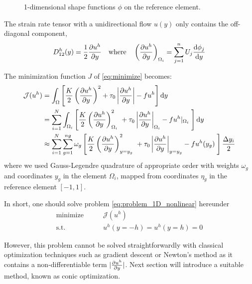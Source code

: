 \documentclass[11 pt]{report}
\begin{document}
\begin{figure}[ht]
    \centering
    
    \caption{1-dimensional shape functions $\phi$ on the reference element.}
    \label{fig:shape_fct_1D}
\end{figure}


The strain rate tensor with a unidirectional flow $u(y)$ only contains the off-diagonal component,
\begin{equation}
    D_{12}^h(y) = \frac{1}{2} \pdv{u^h}{y} \quad \text{where} \quad \left(\pdv{u^h}{y}\right)_{\Omega_i} = \sum_{j=1}^{n} U_j \dv{\phi_j}{y}
\end{equation}

The minimization function $J$ of \autoref{eq:minimize} becomes:
\begin{equation}
\begin{aligned}
    \mathcal{J}(u^h) &= \int_{\Omega} \left[ \frac{K}{2} \left(\pdv{u^h}{y}\right)^2 + \tau_0 \left|\pdv{u^h}{y}\right| - f u^h \right] \dd y\\
    &= \sum_{i=1}^N \int_{\Omega_i} \left[\frac{K}{2}  \left(\pdv{u^h}{y}\right)^2_{\Omega_i} \ + \tau_0 \left|\pdv{u^h}{y}\right|_{\Omega_i} - f u^h\vert_{\Omega_i} \; \right] \dd y\\
    &\approx \sum_{i=1}^N \sum_{g=1}^{ng} \omega_{g} \left[\frac{K}{2}  \left(\pdv{u^h}{y}\right)^2_{y=y_g} \ + \tau_0 \left|\pdv{u^h}{y}\right|_{y=y_g} - f u^h(y_g) \; \right] \frac{\Delta y_i}{2}
\end{aligned}
\end{equation}
where we used Gauss-Legendre quadrature of appropriate order with weights $\omega_g$ and coordinates $y_g$ in the element $\Omega_i$, mapped from coordinates $\eta_g$ in the reference element $[-1,1]$.

In short, one should solve problem \eqref{eq:problem_1D_nonlinear} hereunder
\begin{equation}
    \begin{aligned}
        \textrm{minimize} \qquad & \mathcal{J}(u^h)\\
        \textrm{s.t.} \qquad & u^h(y=-h) = u^h(y=h) = 0
    \end{aligned}\label{eq:problem_1D_nonlinear}
\end{equation}

However, this problem cannot be solved straightforwardly with classical optimization techniques such as gradient descent or Newton's method as it contains a non-differentiable term $|\pdv{u^h}{y}|$. Next section will introduce a suitable method, known as conic optimization.
\end{document}
